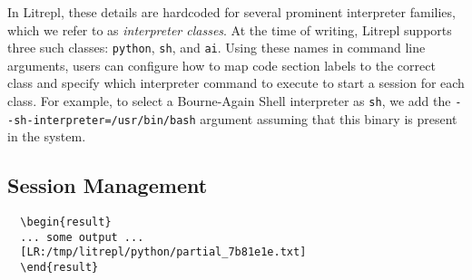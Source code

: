 \documentclass[letterpaper,12pt,twocolumn]{article}
\begin{document}
In Litrepl, these details are hardcoded for several prominent interpreter
families, which we refer to as \textit{interpreter classes}. At the time of
writing, Litrepl supports three such classes: \texttt{python}, \texttt{sh}, and
\texttt{ai}. Using these names in command line arguments, users can configure
how to map code section labels to the correct class and specify which
interpreter command to execute to start a session for each class. For example,
to select a Bourne-Again Shell interpreter as \verb|sh|, we add the
\verb|--sh-interpreter=/usr/bin/bash| argument assuming that this binary is
present in the system.

\subsection{Session Management}

\begin{comment}
\begin{sh}
echo -n '\begin' ; echo '{verbatim}'
echo '\begin{result}'
litrepl --python-auxdir=/tmp/litrepl/python restart python
{
cat <<EOF
import time
print('... some output ...')
time.sleep(9999)
EOF
}|litrepl --python-auxdir=/tmp/litrepl/python --timeout=1,inf eval-code python
echo '\end{result}'
echo -n '\end'; echo '{verbatim}'
\end{sh}
\end{comment}

\begin{figure*}[hbt!]
  \centering
  \begin{minipage}{\textwidth}
  \begin{verbatim}
  \begin{result}
  ... some output ...
  [LR:/tmp/litrepl/python/partial_7b81e1e.txt]
  \end{result}
  \end{verbatim}
  \end{minipage}
  \caption{Example partial result section that ends with a continuation tag,
  where \texttt{LR:} is a distinguishable prefix, and the rest is the filename
  storing a response of the interpreter to the section being evaluated.}
  \label{fig:partial-result}
\end{figure*}
\end{document}
